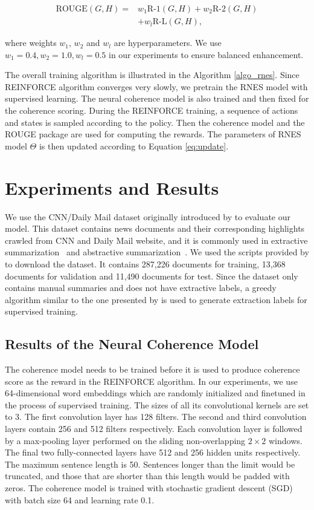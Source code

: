 \begin{align*}
	\text{ROUGE}(G, H) = & w_1 \text{R-1}(G, H) + w_2 \text{R-2}(G, H) \\
	& + w_l \text{R-L}(G, H),
	\end{align*}

where weights $w_1$, $w_2$ and $w_l$ are hyperparameters. We use $w_1=0.4, w_2=1.0, w_l=0.5$ in our experiments to ensure balanced enhancement.

	The overall training algorithm is illustrated in the Algorithm \ref{algo_rnes}. Since REINFORCE algorithm converges very slowly, we pretrain the RNES model with supervised learning. The neural coherence model is also trained and then fixed for the coherence scoring. During the REINFORCE training, a sequence of actions and states is sampled according to the policy. Then the coherence model and the ROUGE package are used for computing the rewards. The parameters of RNES model $\Theta$ is then updated according to Equation \ref{eq:update}. 

	\section{Experiments and Results}

	We use the CNN/Daily Mail dataset originally introduced by \cite{hermann_teaching_2015} to evaluate our model. This dataset contains news documents and their corresponding highlights crawled from CNN and Daily Mail website, and it is commonly used in extractive summarization~\cite{jianpeng2016,SummaRuNNer} and abstractive summarization~\cite{nallapati_ramesh_abstractive_2016,see_get_2017}. We used the scripts provided by \cite{hermann_teaching_2015} to download the dataset. It contains 287,226 documents for training, 13,368 documents for validation and 11,490 documents for test. Since the dataset only contains manual summaries and does not have extractive labels, a greedy algorithm similar to the one presented by \cite{SummaRuNNer} is used to generate extraction labels for supervised training.

	\subsection{Results of the Neural Coherence Model} The coherence model needs to be trained before it is used to produce coherence score as the reward in the REINFORCE algorithm. In our experiments,  we use 64-dimensional word embeddings which are randomly initialized and finetuned in the process of supervised training. The sizes of all its convolutional kernels are set to 3. The first convolution layer has 128 filters. The second and third convolution layers contain 256 and 512 filters respectively. Each convolution layer is followed by a max-pooling layer performed on the sliding non-overlapping $2\times2$ windows. The final two fully-connected layers have 512 and 256 hidden units respectively. The maximum sentence length is 50. Sentences longer than the limit would be truncated, and those that are shorter than this length would be padded with zeros. The coherence model is trained with stochastic gradient descent (SGD) with batch size 64 and learning rate 0.1. 

